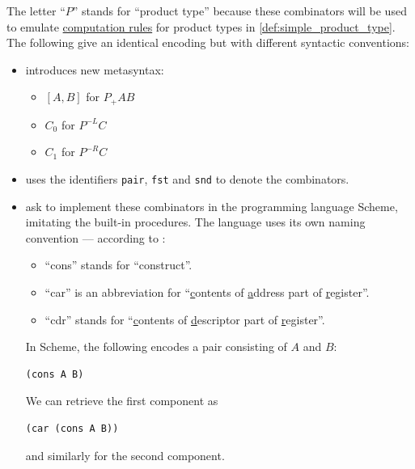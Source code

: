 \begin{example}
\begin{thmenum}
    The letter \enquote{\( P \)} stands for \enquote{product type} because these combinators will be used to emulate \hyperref[rem:type_theory_rule_classification/equality/comp]{computation rules} for product types in \cref{def:simple_product_type}. The following give an identical encoding but with different syntactic conventions:
    \begin{itemize}
      \item \Textcite[def. 6.2.4]{Barendregt1984LambdaCalculus} introduces new metasyntax:
      \begin{itemize}
        \item \( [A, B] \) for \( P_+ A B \)
        \item \( C_0 \) for \( P^{-L} C \)
        \item \( C_1 \) for \( P^{-R} C \)
      \end{itemize}

      \item \Textcite[\S 3.3.3]{Mimram2020ProgramEqualsProof} uses the identifiers \Verb|pair|, \Verb|fst| and \Verb|snd| to denote the combinators.

      \item \Textcite[exerc. 2.5]{AbelsonSussman2012eSICP} ask to implement these combinators in the programming language Scheme, imitating the built-in procedures. The language uses its own naming convention --- according to \cite[115]{AbelsonSussman2012eSICP}:
      \begin{itemize}
        \item \enquote{cons} stands for \enquote{construct}.
        \item \enquote{car} is an abbreviation for \enquote{\underline{c}ontents of \underline{a}ddress part of \underline{r}egister}.
        \item \enquote{cdr} stands for \enquote{\underline{c}ontents of \underline{d}escriptor part of \underline{r}egister}.
      \end{itemize}

      In Scheme, the following encodes a pair consisting of \( A \) and \( B \):
      \begin{Verbatim}[gobble=6]
        (cons A B)
      \end{Verbatim}

      We can retrieve the first component as
      \begin{Verbatim}[gobble=6]
        (car (cons A B))
      \end{Verbatim}
      and similarly for the second component.
    \end{itemize}


\end{thmenum}
\end{example}
